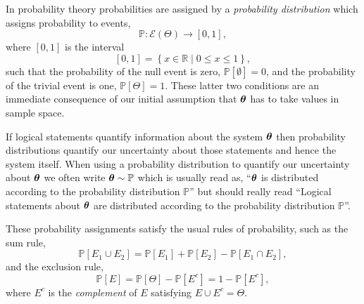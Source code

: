 \documentclass[11pt, oneside]{article}
\newcommand{\PP}{ \mathbb{P} }
\newcommand{\RR}{ \mathbb{R} }
\newcommand{\bt}{ \mbox{\boldmath{$\theta$}} }
\begin{document}
In probability theory probabilities are assigned by a \emph{probability 
distribution} which assigns probability to events,
%
\begin{equation*}
\PP : \mathcal{E} \! \left( \Theta \right) \rightarrow \left[0, 1 \right],
\end{equation*}
%
where $\left[0, 1\right]$ is the interval
%
\begin{equation*}
\left[ 0, 1 \right] = \left\{ x \in \RR \mid 0 \le x \le 1 \right\},
\end{equation*}
%
such that the probability of the null event is zero, 
$\PP \! \left[ \emptyset \right] = 0$, and the probability of the trivial
event is one, $\PP \! \left[ \Theta \right] = 1$.  These latter
two conditions are an immediate consequence of our initial
assumption that $\bt$ has to take values in sample space.

If logical statements quantify information about the system $\bt$ then
probability distributions quantify our uncertainty about those statements
and hence the system itself.  When using a probability distribution to 
quantify our uncertainty about $\bt$ we often write $\bt \sim \PP$ which 
is usually read as, ``$\bt$ is distributed according to the probability 
distribution $\PP$'' but should really read ``Logical statements about 
$\bt$ are distributed according to the probability distribution $\PP$''.

These probability assignments satisfy the usual rules of probability, 
such as the sum rule,
%
\begin{equation*}
\PP \! \left[ E_{1} \cup E_{2} \right]
= 
\PP \! \left[ E_{1} \right] + \PP \! \left[ E_{2} \right] 
- \PP \! \left[ E_{1} \cap E_{2} \right],
\end{equation*}
%
and the exclusion rule,
%
\begin{equation*}
\PP \! \left[ E \right] 
= 
\PP \! \left[ \Theta \right] - \PP \! \left[ E^{c} \right]
=
1 - \PP \! \left[ E^{c} \right],
\end{equation*}
%
where $E^{c}$ is the \emph{complement} of $E$ satisfying
$E \cup E^{c} = \Theta$.
\end{document}

